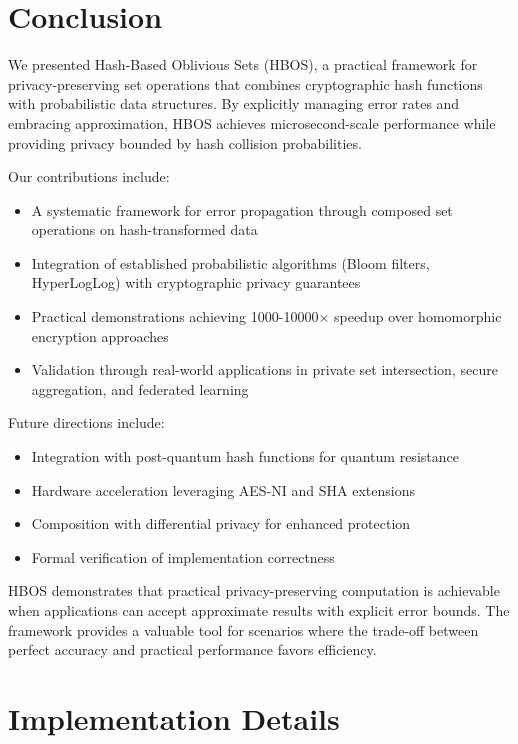 \documentclass[10pt,conference]{IEEEtran}
\begin{document}
\section{Conclusion}
\label{sec:conclusion}

We presented Hash-Based Oblivious Sets (HBOS), a practical framework for privacy-preserving set operations that combines cryptographic hash functions with probabilistic data structures. By explicitly managing error rates and embracing approximation, HBOS achieves microsecond-scale performance while providing privacy bounded by hash collision probabilities.

Our contributions include:
\begin{itemize}
\item A systematic framework for error propagation through composed set operations on hash-transformed data
\item Integration of established probabilistic algorithms (Bloom filters, HyperLogLog) with cryptographic privacy guarantees
\item Practical demonstrations achieving 1000-10000× speedup over homomorphic encryption approaches
\item Validation through real-world applications in private set intersection, secure aggregation, and federated learning
\end{itemize}

Future directions include:
\begin{itemize}
\item Integration with post-quantum hash functions for quantum resistance
\item Hardware acceleration leveraging AES-NI and SHA extensions
\item Composition with differential privacy for enhanced protection
\item Formal verification of implementation correctness
\end{itemize}

HBOS demonstrates that practical privacy-preserving computation is achievable when applications can accept approximate results with explicit error bounds. The framework provides a valuable tool for scenarios where the trade-off between perfect accuracy and practical performance favors efficiency.




\appendix

\section{Implementation Details}
\end{document}
